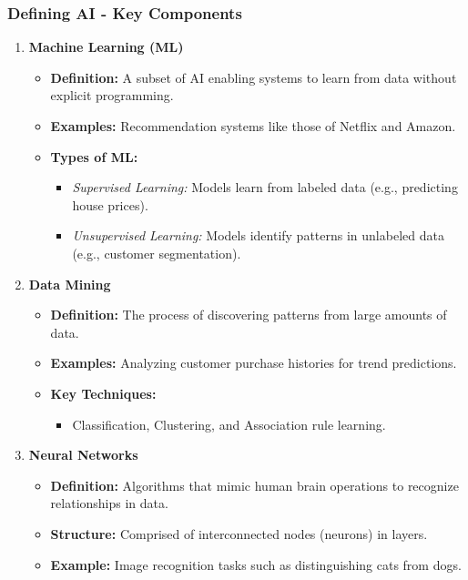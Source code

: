 \documentclass[aspectratio=169]{beamer}
\begin{document}
\begin{frame}[fragile]
    \frametitle{Defining AI - Key Components}
    \begin{enumerate}
        \item \textbf{Machine Learning (ML)}
        \begin{itemize}
            \item \textbf{Definition:} A subset of AI enabling systems to learn from data without explicit programming.
            \item \textbf{Examples:} Recommendation systems like those of Netflix and Amazon.
            \item \textbf{Types of ML:}
            \begin{itemize}
                \item \textit{Supervised Learning:} Models learn from labeled data (e.g., predicting house prices).
                \item \textit{Unsupervised Learning:} Models identify patterns in unlabeled data (e.g., customer segmentation).
            \end{itemize}
        \end{itemize}
        
        \item \textbf{Data Mining}
        \begin{itemize}
            \item \textbf{Definition:} The process of discovering patterns from large amounts of data.
            \item \textbf{Examples:} Analyzing customer purchase histories for trend predictions.
            \item \textbf{Key Techniques:}
            \begin{itemize}
                \item Classification, Clustering, and Association rule learning.
            \end{itemize}
        \end{itemize}
        
        \item \textbf{Neural Networks}
        \begin{itemize}
            \item \textbf{Definition:} Algorithms that mimic human brain operations to recognize relationships in data.
            \item \textbf{Structure:} Comprised of interconnected nodes (neurons) in layers.
            \item \textbf{Example:} Image recognition tasks such as distinguishing cats from dogs.
        \end{itemize}
    \end{enumerate}
\end{frame}
\end{document}
